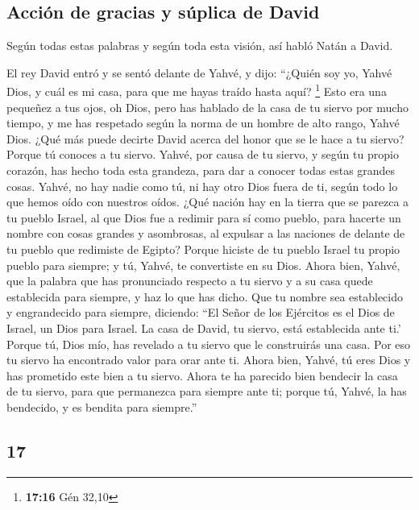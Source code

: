 \begin{paracol}{2}
{\subsection{Acción de gracias y súplica de
David}\label{acciuxf3n-de-gracias-y-suxfaplica-de-david}}

 Según todas estas palabras y según toda esta visión, así
habló Natán a David.

 El rey David entró y se sentó delante de Yahvé, y dijo:
``¿Quién soy yo, Yahvé Dios, y cuál es mi casa, para que me hayas traído
hasta aquí? \footnote{\textbf{17:16} Gén 32,10}  Esto era
una pequeñez a tus ojos, oh Dios, pero has hablado de la casa de tu
siervo por mucho tiempo, y me has respetado según la norma de un hombre
de alto rango, Yahvé Dios.  ¿Qué más puede decirte David
acerca del honor que se le hace a tu siervo? Porque tú conoces a tu
siervo.  Yahvé, por causa de tu siervo, y según tu propio
corazón, has hecho toda esta grandeza, para dar a conocer todas estas
grandes cosas.  Yahvé, no hay nadie como tú, ni hay otro
Dios fuera de ti, según todo lo que hemos oído con nuestros oídos.
 ¿Qué nación hay en la tierra que se parezca a tu pueblo
Israel, al que Dios fue a redimir para sí como pueblo, para hacerte un
nombre con cosas grandes y asombrosas, al expulsar a las naciones de
delante de tu pueblo que redimiste de Egipto?  Porque
hiciste de tu pueblo Israel tu propio pueblo para siempre; y tú, Yahvé,
te convertiste en su Dios.  Ahora bien, Yahvé, que la
palabra que has pronunciado respecto a tu siervo y a su casa quede
establecida para siempre, y haz lo que has dicho.  Que tu
nombre sea establecido y engrandecido para siempre, diciendo: ``El Señor
de los Ejércitos es el Dios de Israel, un Dios para Israel. La casa de
David, tu siervo, está establecida ante ti.'  Porque tú,
Dios mío, has revelado a tu siervo que le construirás una casa. Por eso
tu siervo ha encontrado valor para orar ante ti.  Ahora
bien, Yahvé, tú eres Dios y has prometido este bien a tu siervo.
 Ahora te ha parecido bien bendecir la casa de tu siervo,
para que permanezca para siempre ante ti; porque tú, Yahvé, la has
bendecido, y es bendita para siempre.''

\switchcolumn
\begin{otherlanguage}{english}

\hypertarget{section-33}{%
\section{17}\label{section-33}}


\end{otherlanguage}
\end{paracol}
